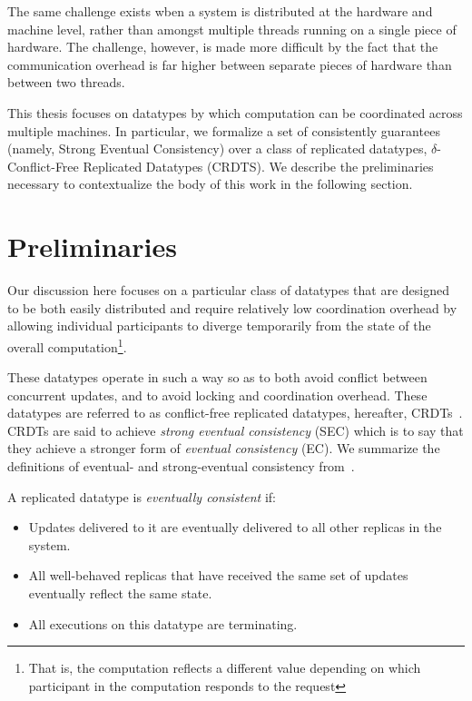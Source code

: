 The same challenge exists wben a system is distributed at the hardware and
machine level, rather than amongst multiple threads running on a single piece of
hardware. The challenge, however, is made more difficult by the fact that the
communication overhead is far higher between separate pieces of hardware than
between two threads.

This thesis focuses on datatypes by which computation can be coordinated across
multiple machines. In particular, we formalize a set of consistently guarantees
(namely, Strong Eventual Consistency) over a class of replicated datatypes,
$\delta$-Conflict-Free Replicated Datatypes (CRDTS). We describe the
preliminaries necessary to contextualize the body of this work in the following
section.

\section{Preliminaries}
Our discussion here focuses on a particular class of datatypes that are designed
to be both easily distributed and require relatively low coordination overhead
by allowing individual participants to diverge temporarily from the state of the
overall computation\footnote{That is, the computation reflects a different
value depending on which participant in the computation responds to the
request}.

These datatypes operate in such a way so as to both avoid conflict between
concurrent updates, and to avoid locking and coordination overhead. These
datatypes are referred to as conflict-free replicated datatypes, hereafter,
CRDTs~\citep{shapiro11}. CRDTs are said to achieve \textit{strong eventual
consistency} (SEC) which is to say that they achieve a stronger form of
\textit{eventual consistency} (EC). We summarize the definitions of eventual-
and strong-eventual consistency from~\cite{shapiro11}.

\begin{definition}
  A replicated datatype is \textit{eventually consistent} if:
  \begin{itemize}
    \item Updates delivered to it are eventually delivered to all other replicas
      in the system.
    \item All well-behaved replicas that have received the same set of updates
      eventually reflect the same state.
    \item All executions on this datatype are terminating.
  \end{itemize}
\end{definition}

